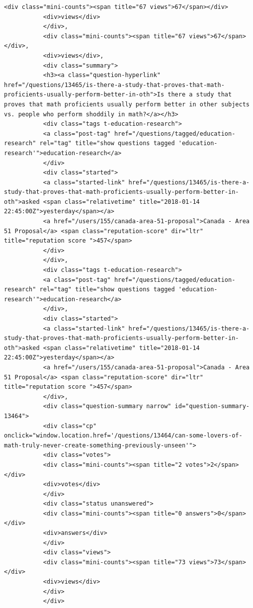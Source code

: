 \documentclass[11pt]{article}
\begin{document}
\begin{Verbatim}[commandchars=\\\{\}]
           <div class="mini-counts"><span title="67 views">67</span></div>
           <div>views</div>
           </div>,
           <div class="mini-counts"><span title="67 views">67</span></div>,
           <div>views</div>,
           <div class="summary">
           <h3><a class="question-hyperlink" href="/questions/13465/is-there-a-study-that-proves-that-math-proficients-usually-perform-better-in-oth">Is there a study that proves that math proficients usually perform better in other subjects vs. people who perform shoddily in math?</a></h3>
           <div class="tags t-education-research">
           <a class="post-tag" href="/questions/tagged/education-research" rel="tag" title="show questions tagged 'education-research'">education-research</a>
           </div>
           <div class="started">
           <a class="started-link" href="/questions/13465/is-there-a-study-that-proves-that-math-proficients-usually-perform-better-in-oth">asked <span class="relativetime" title="2018-01-14 22:45:00Z">yesterday</span></a>
           <a href="/users/155/canada-area-51-proposal">Canada - Area 51 Proposal</a> <span class="reputation-score" dir="ltr" title="reputation score ">457</span>
           </div>
           </div>,
           <div class="tags t-education-research">
           <a class="post-tag" href="/questions/tagged/education-research" rel="tag" title="show questions tagged 'education-research'">education-research</a>
           </div>,
           <div class="started">
           <a class="started-link" href="/questions/13465/is-there-a-study-that-proves-that-math-proficients-usually-perform-better-in-oth">asked <span class="relativetime" title="2018-01-14 22:45:00Z">yesterday</span></a>
           <a href="/users/155/canada-area-51-proposal">Canada - Area 51 Proposal</a> <span class="reputation-score" dir="ltr" title="reputation score ">457</span>
           </div>,
           <div class="question-summary narrow" id="question-summary-13464">
           <div class="cp" onclick="window.location.href='/questions/13464/can-some-lovers-of-math-truly-never-create-something-previously-unseen'">
           <div class="votes">
           <div class="mini-counts"><span title="2 votes">2</span></div>
           <div>votes</div>
           </div>
           <div class="status unanswered">
           <div class="mini-counts"><span title="0 answers">0</span></div>
           <div>answers</div>
           </div>
           <div class="views">
           <div class="mini-counts"><span title="73 views">73</span></div>
           <div>views</div>
           </div>
           </div>

\end{Verbatim}
\end{document}
